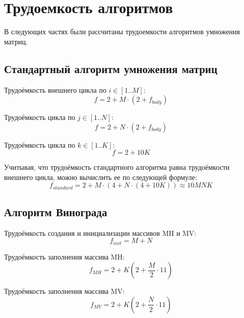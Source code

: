 \section{Трудоемкость алгоритмов}

В следующих частях были рассчитаны трудоемкости алгоритмов умножения матриц.

\subsection{Стандартный алгоритм умножения матриц}

Трудоёмкость внешнего цикла по $i \in [1..M]$:
\begin{equation}
	\label{for:xxxxx}
	f = 2 + M \cdot (2 + f_{body})
\end{equation}

Трудоёмкость цикла по $j \in [1..N]$:
\begin{equation}
	\label{for:yyyyy}
	f = 2 + N \cdot (2 + f_{body})
\end{equation}

Трудоёмкость цикла по $k \in [1..K]$:
\begin{equation}
	\label{for:yyyyy}
	f = 2 + 10K
\end{equation}

Учитывая, что трудоёмкость стандартного алгоритма равна трудоёмкости внешнего цикла, можно вычислить ее по следующей формуле:
\begin{equation}
	\label{for:standard}
	f_{standard} = 2 + M \cdot (4 + N \cdot (4 + 10K)) \approx 10MNK
\end{equation}

\subsection{Алгоритм Винограда}

Трудоёмкость создания и инициализации массивов MH и MV:
\begin{equation}
	\label{for:init}
	f_{init} = M + N
\end{equation}

Трудоёмкость заполнения массива MH:
\begin{equation}
	\label{for:MH}
	f_{MH} = 2 + K (2 + \frac{M}{2} \cdot 11)
\end{equation}

Трудоёмкость заполнения массива MV:
\begin{equation}
	\label{for:MV}
	f_{MV} = 2 + K (2 + \frac{N}{2} \cdot 11)
\end{equation}
	
